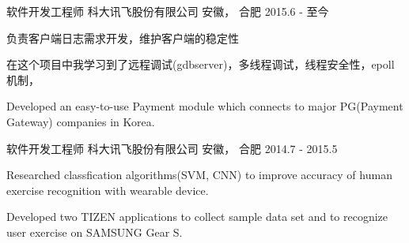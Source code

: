 

\begin{cventries}

  \cventry
    {软件开发工程师} %
    {科大讯飞股份有限公司} %
    {安徽， 合肥} %
    {2015.6 - 至今} %
    {
      \begin{cvitems} %
        \item {负责客户端日志需求开发，维护客户端的稳定性}
        \item {在这个项目中我学习到了远程调试(gdbserver)，多线程调试，线程安全性，epoll机制，}
        \item {Developed an easy-to-use Payment module which connects to major PG(Payment Gateway) companies in Korea.}
      \end{cvitems}
    }

  \cventry
    {软件开发工程师} %
    {科大讯飞股份有限公司} %
    {安徽， 合肥} %
    {2014.7 - 2015.5} %
    {
      \begin{cvitems} %
        \item {Researched classfication algorithms(SVM, CNN) to improve accuracy of human exercise recognition with wearable device.}
        \item {Developed two TIZEN applications to collect sample data set and to recognize user exercise on SAMSUNG Gear S.}
      \end{cvitems}
    }

\end{cventries}
